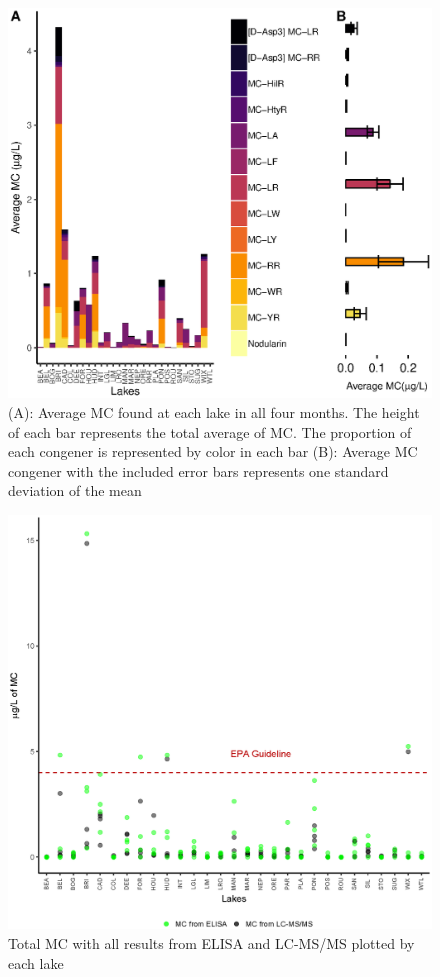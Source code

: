 \begin{figure}[!h]
 \includegraphics[width=\textwidth]{figures/congenerbar}
 \caption{
 (A): Average MC found at each lake in all four months. The height of each bar represents the total average of MC. The proportion of each congener is represented by color in each bar  
(B): Average MC congener with the included error bars represents one standard deviation of the mean}
 \label{fig:congenerbar}
\end{figure}

\begin{figure}[!h]
 \includegraphics[width=\textwidth]{figures/Microcystin}
 \caption{Total MC with all results from ELISA and LC-MS/MS plotted by each lake}
 \label{fig:microcystin}
\end{figure}

